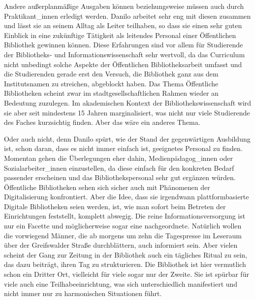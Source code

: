 \documentclass[a4paper,
fontsize=11pt,
oneside,
numbers=noperiodatend,
parskip=half-,
bibliography=totoc,
final
]{scrartcl}
\begin{document}
Andere außerplanmäßige Ausgaben können beziehungsweise müssen auch durch
Praktikant\_innen erledigt werden. Danilo arbeitet sehr eng mit diesen
zusammen und lässt sie an seinem Alltag als Leiter teilhaben, so dass
sie einen sehr guten Einblick in eine zukünftige Tätigkeit als leitendes
Personal einer Öffentlichen Bibliothek gewinnen können. Diese
Erfahrungen sind vor allem für Studierende der Bibliotheks- und
Informationswissenschaft sehr wertvoll, da das Curriculum nicht
unbedingt solche Aspekte der Öffentlichen Bibliotheksarbeit umfasst und
die Studierenden gerade erst den Versuch, die Bibliothek ganz aus dem
Institutsnamen zu streichen, abgeblockt haben. Das Thema Öffentliche
Bibliotheken scheint zwar im stadtgesellschaftlichen Rahmen wieder an
Bedeutung zuzulegen. Im akademischen Kontext der Bibliothekswissenschaft
wird sie aber seit mindestens 15 Jahren marginalisiert, was nicht nur
viele Studierende des Faches kurzsichtig finden. Aber das wäre ein
anderes Thema.

Oder auch nicht, denn Danilo spürt, wie der Stand der gegenwärtigen
Ausbildung ist, schon daran, dass es nicht immer einfach ist, geeignetes
Personal zu finden. Momentan gehen die Überlegungen eher dahin,
Medienpädagog\_innen oder Sozialarbeiter\_innen einzustellen, da diese
einfach für den konkreten Bedarf passender erscheinen und das
Bibliothekspersonal sehr gut ergänzen würden. Öffentliche Bibliotheken
sehen sich sicher auch mit Phänomenen der Digitalisierung konfrontiert.
Aber die Idee, dass sie irgendwann plattformbasierte Digitale
Bibliotheken seien werden, ist, wie man sofort beim Betreten der
Einrichtungen feststellt, komplett abwegig. Die reine
Informationsversorgung ist nur ein Facette und möglicherweise sogar eine
nachgeordnete. Natürlich wollen die vorwiegend Männer, die ab morgens um
zehn die Tagespresse im Leseraum über der Greifswalder Straße
durchblättern, auch informiert sein. Aber vielen scheint der Gang zur
Zeitung in der Bibliothek auch ein tägliches Ritual zu sein, das dazu
beiträgt, ihren Tag zu strukturieren. Die Bibliothek ist hier vermutlich
schon ein Dritter Ort, vielleicht für viele sogar nur der Zweite. Sie
ist spürbar für viele auch eine Teilhabeeinrichtung, was sich
unterschiedlich manifestiert und nicht immer nur zu harmonischen
Situationen führt.
\end{document}
